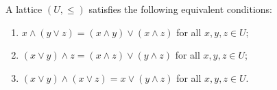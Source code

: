 A lattice $(U, \leq)$ satisfies the following equivalent conditions:
\begin{enumerate}
\item[(a)] $x \wedge (y \vee z) = (x \wedge y) \vee (x \wedge z)$ for all $x, y, z \in U$;
\item[(b)] $(x \vee y) \wedge z = (x \wedge z) \vee (y \wedge z)$ for all $x, y, z \in U$;
\item[(c)] $(x \vee y) \wedge (x \vee z) = x \vee (y \wedge z)$ for all $x, y, z \in U$.
\end{enumerate}